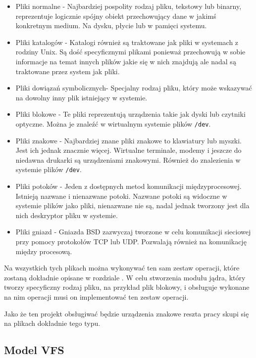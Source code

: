 \documentclass[10pt]{scrartcl}
\begin{document}
\begin{itemize}
\itemsep1pt\parskip0pt
\item
  Pliki normalne - Najbardziej pospolity rodzaj pliku, tekstowy lub binarny, reprezentuje logicznie spójny obiekt przechowujący dane w jakimś konkretnym medium. Na dysku, płycie lub w pamięci systemu.
\item
  Pliki katalogów - Katalogi również są traktowane jak pliki w systemach z rodziny Unix. Są dość specyficznymi plikami ponieważ przechowują w sobie informacje na temat innych plików jakie się w nich znajdują ale nadal są traktowane przez system jak pliki.
\item
  Pliki dowiązań symbolicznych- Specjalny rodzaj pliku, który może wskazywać na dowolny inny plik istniejący w systemie.
\item
  Pliki blokowe - Te pliki reprezentują urządzenia takie jak dyski lub czytniki optyczne. Można je znaleźć w wirtualnym systemie plików \texttt{/dev}.
\item
  Pliki znakowe - Najbardziej znane pliki znakowe to klawiatury lub myszki. Jest ich jednak znacznie więcej. Wirtualne terminale, modemy i jeszcze do niedawna drukarki są urządzeniami znakowymi. Również do znalezienia w systemie plików \texttt{/dev}.
\item
  Pliki potoków - Jeden z dostępnych metod komunikacji międzyprocesowej.  Istnieją nazwane i nienazwane potoki. Nazwane potoki są widoczne w systemie plików jako pliki, nienazwane nie są, nadal jednak tworzony jest dla nich deskryptor pliku w systemie.
\item
  Pliki gniazd - Gniazda BSD zazwyczaj tworzone w celu komunikacji sieciowej przy pomocy protokołów TCP lub UDP\@. Pozwalają również na komunikację między procesową.
\end{itemize}

Na wszystkich tych plikach można wykonywać ten sam zestaw operacji, które zostaną dokładnie opisane w rozdziale . W celu stworzenia modułu jądra, który tworzy specyficzny rodzaj pliku, na przykład plik blokowy, i obsługuje wykonane na nim operacji musi on implementować ten zestaw operacji.

Jako że ten projekt obsługiwać będzie urządzenia znakowe reszta pracy skupi się na plikach dokładnie tego typu.

\subsection{Model VFS}
\label{vfs}
\end{document}
